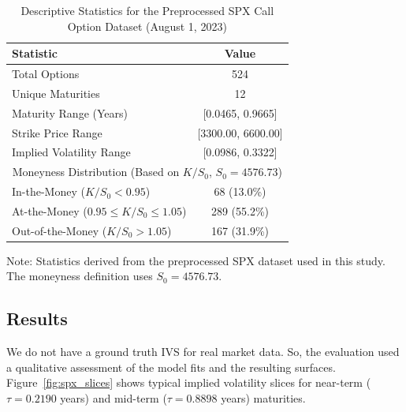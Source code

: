 \documentclass[preprint,12pt]{elsarticle}
\begin{document}
\begin{table}[htbp]\small %
    \centering
    \caption{Descriptive Statistics for the Preprocessed SPX Call Option Dataset (August 1, 2023)}
    \label{tab:spx_data_summary}
    \begin{threeparttable}
    {\small %
        \begin{tabular}{@{}lc@{}}
            \toprule
            Statistic                 & Value \\
            \midrule
            Total Options             & 524 \\
            Unique Maturities         & 12 \\
            Maturity Range (Years)    & [0.0465, 0.9665] \\
            Strike Price Range        & [3300.00, 6600.00] \\
            Implied Volatility Range  & [0.0986, 0.3322] \\
            \midrule
            \multicolumn{2}{c}{Moneyness Distribution (Based on $K/S_0$, $S_0 = 4576.73$)} \\ %
            \midrule
            In-the-Money ($K/S_0 < 0.95$)   & 68 (13.0\%) \\
            At-the-Money ($0.95 \le K/S_0 \le 1.05$) & 289 (55.2\%) \\
            Out-of-the-Money ($K/S_0 > 1.05$)  & 167 (31.9\%) \\
            \bottomrule
        \end{tabular}
    } %
        \begin{tablenotes}
            \item Note: Statistics derived from the preprocessed SPX dataset used in this study. The moneyness definition uses $S_0 = 4576.73$.
        \end{tablenotes}
    \end{threeparttable}
\end{table}


\subsection{Results}

We do not have a ground truth IVS for real market data. So, the evaluation used a qualitative assessment of the model fits and the resulting surfaces. Figure~\ref{fig:spx_slices} shows typical implied volatility slices for near-term ($\tau=0.2190$ years) and mid-term ($\tau=0.8898$ years) maturities.
\end{document}
